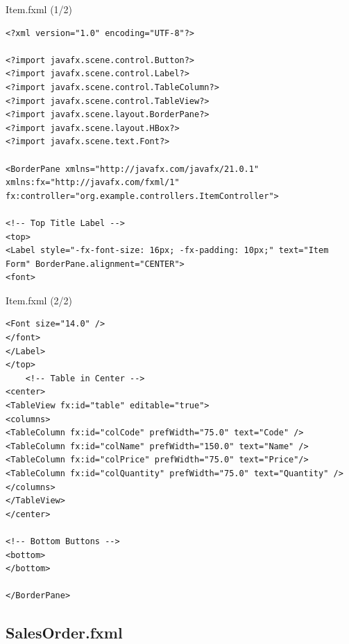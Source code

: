 \documentclass[aspectratio=169, table]{beamer}
\begin{document}
\begin{frame}[fragile]{Item.fxml (1/2)}
\vspace{20pt}
\begin{lstlisting}[style=XmlStyle]
<?xml version="1.0" encoding="UTF-8"?>

<?import javafx.scene.control.Button?>
<?import javafx.scene.control.Label?>
<?import javafx.scene.control.TableColumn?>
<?import javafx.scene.control.TableView?>
<?import javafx.scene.layout.BorderPane?>
<?import javafx.scene.layout.HBox?>
<?import javafx.scene.text.Font?>

<BorderPane xmlns="http://javafx.com/javafx/21.0.1" xmlns:fx="http://javafx.com/fxml/1" 
fx:controller="org.example.controllers.ItemController">

<!-- Top Title Label -->
<top>
<Label style="-fx-font-size: 16px; -fx-padding: 10px;" text="Item Form" BorderPane.alignment="CENTER">
<font>

\end{lstlisting}
\end{frame}


\begin{frame}[fragile]{Item.fxml (2/2)}
\vspace{20pt}
\begin{lstlisting}[style=XmlStyle]
	<Font size="14.0" />
</font>
</Label>
</top>
	<!-- Table in Center -->
<center>
<TableView fx:id="table" editable="true">
<columns>
<TableColumn fx:id="colCode" prefWidth="75.0" text="Code" />
<TableColumn fx:id="colName" prefWidth="150.0" text="Name" />
<TableColumn fx:id="colPrice" prefWidth="75.0" text="Price"/>
<TableColumn fx:id="colQuantity" prefWidth="75.0" text="Quantity" />
</columns>
</TableView>
</center>

<!-- Bottom Buttons -->
<bottom>
</bottom>

</BorderPane>
\end{lstlisting}
\end{frame}


\subsection{SalesOrder.fxml}
\end{document}

